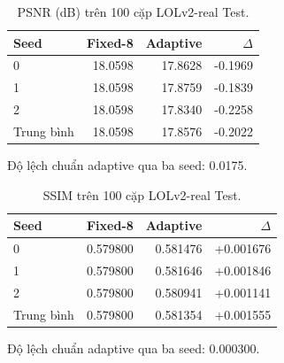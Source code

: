 \begin{table}[H]\centering\small
\caption{PSNR (dB) trên 100 cặp LOLv2-real Test.}
\begin{tabular}{lrrr}\toprule
Seed & Fixed-8 & Adaptive & $\Delta$\\\midrule
0 & 18.0598 & 17.8628 & -0.1969\\
1 & 18.0598 & 17.8759 & -0.1839\\
2 & 18.0598 & 17.8340 & -0.2258\\
Trung bình & 18.0598 & 17.8576 & -0.2022\\
\bottomrule\end{tabular}
\end{table}
Độ lệch chuẩn adaptive qua ba seed: 0.0175.

\begin{table}[H]\centering\small
\caption{SSIM trên 100 cặp LOLv2-real Test.}
\begin{tabular}{lrrr}\toprule
Seed & Fixed-8 & Adaptive & $\Delta$\\\midrule
0 & 0.579800 & 0.581476 & +0.001676\\
1 & 0.579800 & 0.581646 & +0.001846\\
2 & 0.579800 & 0.580941 & +0.001141\\
Trung bình & 0.579800 & 0.581354 & +0.001555\\
\bottomrule\end{tabular}
\end{table}
Độ lệch chuẩn adaptive qua ba seed: 0.000300.

